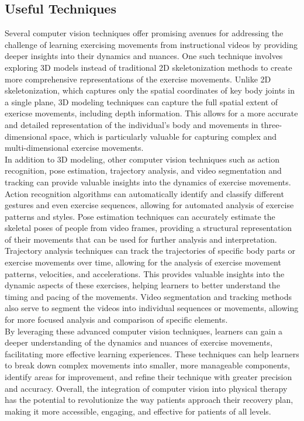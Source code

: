 \subsection{Useful Techniques}
\indent Several computer vision techniques offer promising avenues for addressing the challenge of learning 
exercising movements from instructional videos by providing deeper insights into their dynamics and nuances. 
One such technique involves exploring 3D models instead of traditional 2D skeletonization
 methods to create more comprehensive representations of the exercise movements. Unlike 2D skeletonization, 
 which captures only the spatial coordinates of key body joints in a single plane, 3D modeling 
 techniques can capture the full spatial extent of exericse movements, including depth information\cite{Alpher03}. This 
 allows for a more accurate and detailed representation of the individual's body and movements in 
 three-dimensional space, which is particularly valuable for capturing complex and multi-dimensional 
 exercise movements\cite{Authors14b}.
\\
\indent In addition to 3D modeling, other computer vision techniques such as action recognition, pose 
estimation, trajectory analysis, and video segmentation and tracking can provide valuable insights 
into the dynamics of exercise movements. Action recognition algorithms can automatically identify and 
classify different gestures and even exercise sequences, allowing for automated analysis of exercise 
patterns and styles. Pose estimation techniques can accurately estimate the skeletal poses of 
people from video frames, providing a structural representation of their movements that can be 
used for further analysis and interpretation.
\\
\indent Trajectory analysis techniques can track the trajectories of specific body parts or exercise movements 
over time, allowing for the analysis of exercise movement patterns, velocities, and accelerations\cite{Alpher02}. This 
provides valuable insights into the dynamic aspects of these exercises, 
helping learners to better understand the timing and pacing of the movements. Video segmentation and 
tracking methods also serve to segment the videos into individual sequences or movements, allowing for more 
focused analysis and comparison of specific elements.
\\
\indent By leveraging these advanced computer vision techniques, learners can gain a deeper understanding 
of the dynamics and nuances of exercise movements, facilitating more effective learning experiences. 
These techniques can help learners to break down complex movements into smaller, more 
manageable components, identify areas for improvement, and refine their technique with greater 
precision and accuracy. Overall, the integration of computer vision into physical therapy has the 
potential to revolutionize the way patients approach their recovery plan, making it more accessible, engaging, 
and effective for patients of all levels.

